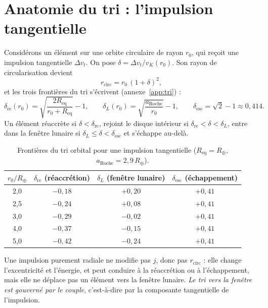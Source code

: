 \documentclass[11pt,a4paper,openany]{report}
\newcommand{\Rt}{R_{\oplus}}
\newcommand{\Req}{R_{\mathrm{eq}}}
\newcommand{\aR}{a_{\mathrm{Roche}}}
\begin{document}
\section{Anatomie du tri : l'impulsion tangentielle}

Considérons un élément sur une orbite circulaire de rayon $r_0$, qui reçoit une impulsion
tangentielle $\Delta v_t$. On pose $\delta=\Delta v_t/v_K(r_0)$. Son rayon de circularisation
devient
\begin{equation}
r_{\mathrm{circ}}=r_0\,(1+\delta)^2,
\label{eq:rcirc-delta}
\end{equation}
et les trois frontières du tri s'écrivent (annexe~\ref{app:tri}) :
\begin{equation}
\delta_{\mathrm{re}}(r_0)=\sqrt{\frac{2\Req}{r_0+\Req}}-1,\qquad
\delta_L(r_0)=\sqrt{\frac{\aR}{r_0}}-1,\qquad
\delta_{\mathrm{esc}}=\sqrt2-1\approx0{,}414.
\label{eq:frontieres}
\end{equation}
Un élément réaccrète si $\delta<\delta_{\mathrm{re}}$, rejoint le disque intérieur si
$\delta_{\mathrm{re}}<\delta<\delta_L$, entre dans la fenêtre lunaire si
$\delta_L\le\delta<\delta_{\mathrm{esc}}$ et s'échappe au-delà.

\begin{table}[htbp]
\centering
\small
\caption{Frontières du tri orbital pour une impulsion tangentielle ($\Req=\Rt$, $\aR=2{,}9\,\Rt$).}
\label{tab:frontieres}
\begin{tabular}{cccc}
\toprule
$r_0/\Rt$ & $\delta_{\mathrm{re}}$ (réaccrétion) & $\delta_L$ (fenêtre lunaire) & $\delta_{\mathrm{esc}}$ (échappement) \\
\midrule
2{,}0 & $-0{,}18$ & $+0{,}20$ & $+0{,}41$ \\
2{,}5 & $-0{,}24$ & $+0{,}08$ & $+0{,}41$ \\
3{,}0 & $-0{,}29$ & $-0{,}02$ & $+0{,}41$ \\
4{,}0 & $-0{,}37$ & $-0{,}15$ & $+0{,}41$ \\
5{,}0 & $-0{,}42$ & $-0{,}24$ & $+0{,}41$ \\
\bottomrule
\end{tabular}
\end{table}

Une impulsion purement radiale ne modifie pas $j$, donc pas $r_{\mathrm{circ}}$ : elle change
l'excentricité et l'énergie, et peut conduire à la réaccrétion ou à l'échappement, mais elle ne
déplace pas un élément vers la fenêtre lunaire. \emph{Le tri vers la fenêtre est gouverné par le
couple}, c'est-à-dire par la composante tangentielle de l'impulsion.
\end{document}
